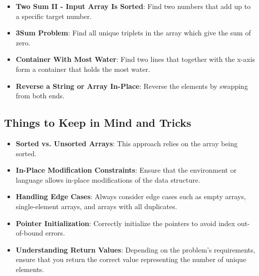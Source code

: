 \begin{itemize}
    \item \textbf{Two Sum II - Input Array Is Sorted}: Find two numbers that add up to a specific target number.
    \item \textbf{3Sum Problem}: Find all unique triplets in the array which give the sum of zero.
    \item \textbf{Container With Most Water}: Find two lines that together with the x-axis form a container that holds the most water.
    \item \textbf{Reverse a String or Array In-Place}: Reverse the elements by swapping from both ends.
\end{itemize}

\subsection*{Things to Keep in Mind and Tricks}
\begin{itemize}
    \item \textbf{Sorted vs. Unsorted Arrays}: This approach relies on the array being sorted.
    \item \textbf{In-Place Modification Constraints}: Ensure that the environment or language allows in-place modifications of the data structure.
    \item \textbf{Handling Edge Cases}: Always consider edge cases such as empty arrays, single-element arrays, and arrays with all duplicates.
    \item \textbf{Pointer Initialization}: Correctly initialize the pointers to avoid index out-of-bound errors.
    \item \textbf{Understanding Return Values}: Depending on the problem's requirements, ensure that you return the correct value representing the number of unique elements.
\end{itemize}

